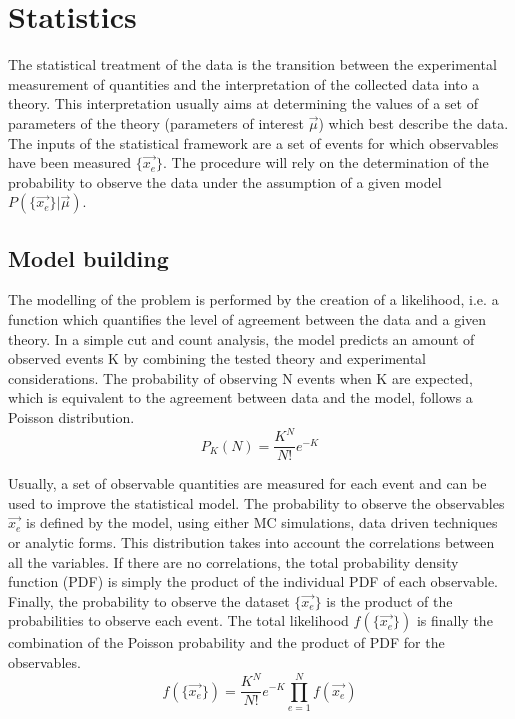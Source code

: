 \chapter{Statistics}
\label{sec:orgc8635b2}

The statistical treatment of the data is the transition between the experimental measurement of quantities and the interpretation of the collected data into a theory.
This interpretation usually aims at determining the values of a set of parameters of the theory (parameters of interest \(\vec{\mu}\)) which best describe the data.
The inputs of the statistical framework are a set of events for which observables have been measured \(\{\vec{x_e}\}\).
The procedure will rely on the determination of the probability to observe the data under the assumption of a given model \(P(\{\vec{x_e}\}| \vec{\mu})\).


\section{Model building}
\label{sec:orgf5f8572}

The modelling of the problem is performed by the creation of a likelihood, i.e. a function which quantifies the level of agreement between the data and a given theory.
In a simple cut and count analysis, the model predicts an amount of observed events K by combining the tested theory and experimental considerations.
The probability of observing N events when K are expected, which is equivalent to the agreement between data and the model, follows a Poisson distribution.
\begin{equation}
P_K(N)=\frac{K^N}{N!}e^{-K}
\end{equation}

Usually, a set of observable quantities are measured for each event and can be used to improve the statistical model.
The probability to observe the observables \(\vec{x_e}\) is defined by the model, using either MC simulations, data driven techniques or analytic forms.
This distribution takes into account the correlations between all the variables.
If there are no correlations, the total probability density function (PDF) is simply the product of the individual PDF of each observable.
Finally, the probability to observe the dataset \(\{\vec{x_e}\}\) is the product of the probabilities to observe each event.
The total likelihood $f(\{\vec{x_e}\})$ is finally the combination of the Poisson probability and the product of PDF for the observables.
\begin{equation}
f(\{\vec{x_e}\}) = \frac{K^N}{N!}e^{-K} \prod\limits_{e=1}^{N} f(\vec{x_e})
\end{equation}

